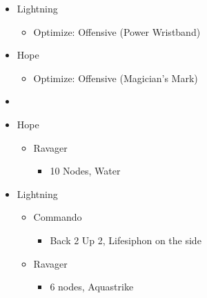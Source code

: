 \begin{paracol}{2}
\begin{menu}
\begin{itemize}
			\equip
			\begin{itemize}
				\item Lightning
				      \begin{itemize}
					      \item Optimize: Offensive (Power Wristband)
				      \end{itemize}
				\item Hope
				      \begin{itemize}
					      \item Optimize: Offensive (Magician's Mark)
				      \end{itemize}
			\end{itemize}
		\end{itemize}
	\end{menu}
	\switchcolumn
	\begin{menu}
		\begin{itemize}
			\paradigm
			\begin{itemize}
				\item {}%
				      {\paradigmline[1]{\textit{\rav}}{\textit{\com}}{}}%
				      {\paradigmline{(\med)}{(\com)}{}}%
				      {\paradigmline{\syn}{(\com)}{}}%
				      {\paradigmline{\rav}{\rav}{}}%
				      {\paradigmline{\rav}{[\rav]}{}}%
				      {\paradigmline{[\rav]}{\com}{}}
			\end{itemize}
			\crystarium
			\begin{itemize}
				\item Hope
				      \begin{itemize}
					      \item Ravager
					            \begin{itemize}
						            \item 10 Nodes, Water
					            \end{itemize}
				      \end{itemize}
				\item Lightning
				      \begin{itemize}
					      \item Commando
					            \begin{itemize}
						            \item Back 2 Up 2, Lifesiphon on the side
					            \end{itemize}
					      \item Ravager
					            \begin{itemize}
						            \item 6 nodes, Aquastrike

\end{itemize}
\end{itemize}
\end{itemize}
\end{itemize}
\end{menu}
\end{paracol}

